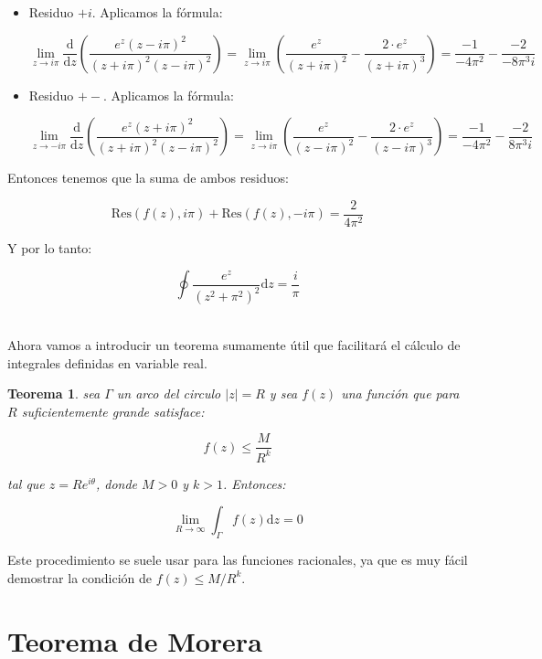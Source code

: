 \documentclass[12pt]{book}
\newcommand{\parentesis}[1]{\left( #1  \right)}
\newcommand{\D}{\mathrm{d}}
\newcommand{\Res}{\mathrm{Res}}
\newtheorem{theorem}{Teorema}[section]
\begin{document}
\begin{itemize}
\item Residuo $+i$. Aplicamos la fórmula:

$$ \lim_{z \rightarrow i\pi} \dfrac{\D}{\D z} \parentesis{\dfrac{e^z (z- i \pi)^2}{(z+i \pi)^2 (z - i \pi)^2 }} = \lim_{z \rightarrow i\pi} \parentesis{\dfrac{e^z}{(z+i \pi)^2 }- \dfrac{2 \cdot e^z}{(z+i \pi)^3 } }= \dfrac{-1}{-4 \pi^2}- \dfrac{-2}{- 8 \pi^3 i} $$

\item Residuo $+-$. Aplicamos la fórmula:

$$ \lim_{z \rightarrow -i\pi} \dfrac{\D}{\D z} \parentesis{\dfrac{e^z (z+ i \pi)^2}{(z+i \pi)^2 (z - i \pi)^2 }} = \lim_{z \rightarrow i\pi} \parentesis{\dfrac{e^z}{(z-i \pi)^2 }- \dfrac{2 \cdot e^z}{(z-i \pi)^3 } }= \dfrac{-1}{-4 \pi^2}- \dfrac{-2}{8 \pi^3 i} $$
\end{itemize}

Entonces tenemos que la suma de ambos residuos:

$$ \Res (f(z),i \pi) + \Res (f(z), - i \pi) = \dfrac{2}{4\pi^2}$$

Y por lo tanto:


\begin{equation}
\oint  \frac{e^z}{(z^2+\pi^2)^2} \D z = \dfrac{i}{\pi}
\end{equation}

\hrulefill \\


Ahora vamos a introducir un teorema sumamente útil que facilitará el cálculo de integrales definidas en variable real. 

\begin{theorem}
sea $\Gamma$ un arco del circulo $|z|=R$ y sea $f(z)$ una función que para $R$ suficientemente grande satisface:

$$ f(z) \leq \frac{M}{R^k} $$

tal que $z=Re^{i \theta}$, donde $M>0$ y $k>1$. Entonces:

$$ \lim_{R \rightarrow \infty} \int_{\Gamma} f(z) \D z = 0 $$

\end{theorem}

Este procedimiento se suele usar para las funciones racionales, ya que es muy fácil demostrar la condición de $f(z) \leq M/R^k$.

\section{Teorema de Morera}
\end{document}
